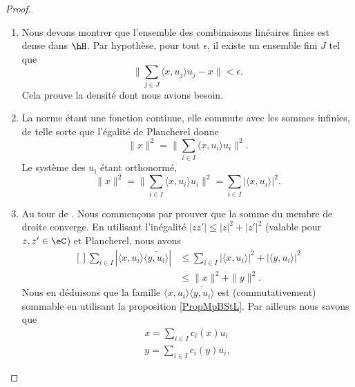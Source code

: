\begin{proof}
\begin{enumerate}
        \item
            Nous devons montrer que l'ensemble des combinaisons linéaires finies est dense dans \( \hH\). Par hypothèse, pour tout \( \epsilon\), il existe un ensemble fini \( J\) tel que
            \begin{equation}
                \| \sum_{j\in J}\langle x, u_j\rangle u_j-x \|<\epsilon.
            \end{equation}
            Cela prouve la densité dont nous avions besoin.
        \item
            La norme étant une fonction continue, elle commute avec les sommes infinies, de telle sorte que l'égalité de Plancherel donne
            \begin{equation}
                \| x \|^2=\| \sum_{i\in I}\langle x, u_i\rangle u_i \|^2.
            \end{equation}
            Le système des \( u_i\) étant orthonormé,
            \begin{equation}
                \| x \|^2=\| \sum_{i\in I}\langle x, u_i\rangle u_i \|^2=\sum_{i\in I}| \langle x, u_i\rangle  |^2.
            \end{equation}
        \item
            Au tour de . Nous commençons par prouver que la somme du membre de droite converge. En utilisant l'inégalité \( | zz' |\leq | z |^2+| z' |^2\) (valable pour \( z,z'\in \eC\)) et Plancherel, nous avons
            \begin{equation}
                \begin{aligned}[]
                    \sum_{i\in I}| \langle x, u_i\rangle \overline{ \langle y, u_i\rangle  } |&\leq\sum_{i\in I}| \langle x, u_i\rangle  |^2+| \langle y, u_i\rangle  |^2\\
                    &\leq \| x \|^2+\| y \|^2.
                \end{aligned}
            \end{equation}
            Nous en déduisons que la famille \( \langle x, u_i\rangle \overline{ \langle y, u_i\rangle  }\) est (commutativement) sommable en utilisant la proposition \ref{PropMpBStL}. Par ailleurs nous savons que
            \begin{subequations}
                \begin{align}
                    x=\sum_{i\in I}c_i(x)u_i\\
                    y=\sum_{i\in I}c_i(y)u_i,
                \end{align}

\end{subequations}
\end{enumerate}
\end{proof}
